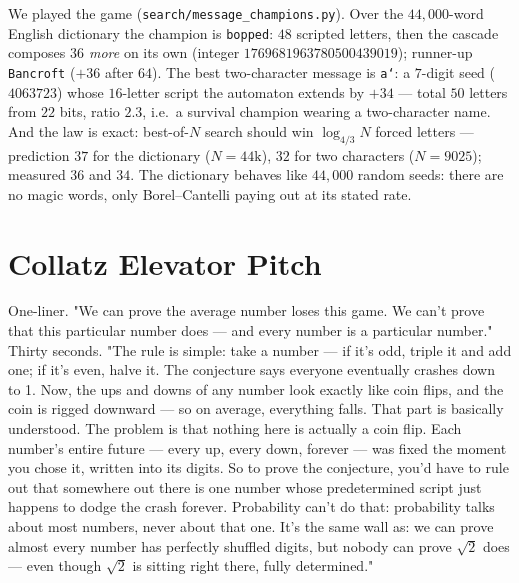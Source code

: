 \documentclass[10pt]{article}
\begin{document}
We played the game (\texttt{search/message\_champions.py}). Over the
$44{,}000$-word English dictionary the champion is \texttt{bopped}:
$48$ scripted letters, then the cascade composes \emph{$36$ more} on
its own (integer $1769681963780500439019$); runner-up
\texttt{Bancroft} ($+36$ after $64$). The best two-character message
is \texttt{a`}: a $7$-digit seed ($4063723$) whose $16$-letter script
the automaton extends by $+34$ --- total $50$ letters from $22$ bits,
ratio $2.3$, i.e.\ a survival champion wearing a two-character name.
And the law is exact: best-of-$N$ search should win
$\log_{4/3}N$ forced letters --- prediction $37$ for the dictionary
($N{=}44\mathrm k$), $32$ for two characters ($N{=}9025$); measured
$36$ and $34$. The dictionary behaves like $44{,}000$ random seeds:
there are no magic words, only Borel--Cantelli paying out at its
stated rate.

\section{Collatz Elevator Pitch}
One-liner. "We can prove the average number loses this game. We can't prove that this particular number does — and every number is a particular
number."\\

Thirty seconds. "The rule is simple: take a number — if it's odd, triple it and add one; if it's even, halve it. The conjecture says everyone
eventually crashes down to 1. Now, the ups and downs of any number look exactly like coin flips, and the coin is rigged downward — so on average,
everything falls. That part is basically understood. The problem is that nothing here is actually a coin flip. Each number's entire future — every
up, every down, forever — was fixed the moment you chose it, written into its digits. So to prove the conjecture, you'd have to rule out that
somewhere out there is one number whose predetermined script just happens to dodge the crash forever. Probability can't do that: probability talks
about most numbers, never about that one. It's the same wall as: we can prove almost every number has perfectly shuffled digits, but nobody can prove
$\sqrt{2}$ does — even though $\sqrt{2}$ is sitting right there, fully determined."\\
\end{document}
